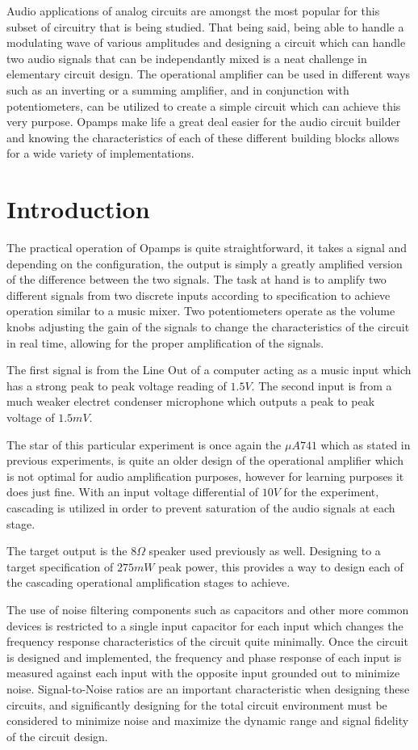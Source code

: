 \documentclass[12pt]{article}
\begin{document}
Audio applications of analog circuits are amongst the most
popular for this subset of circuitry that is being studied. That being said,
being able to handle a modulating wave of various amplitudes and designing a
circuit which can handle two audio signals that can be independantly mixed is a
neat challenge in elementary circuit design. The operational amplifier can be
used in different ways such as an inverting or a summing amplifier, and in
conjunction with potentiometers, can be utilized to create a simple circuit
which can achieve this very purpose. Opamps make life a great deal easier for
the audio circuit builder and knowing the characteristics of each of these
different building blocks allows for a wide variety of implementations.
\newpage
\section{Introduction}
The practical operation of Opamps is quite straightforward, it takes a signal
and depending on the configuration, the output is simply a greatly amplified
version of the difference between the two signals. The task at hand is to
amplify two different signals from two discrete inputs according to
specification to achieve operation similar to a music mixer. Two potentiometers
operate as the volume knobs adjusting the gain of the signals to change the
characteristics of the circuit in real time, allowing for the proper
amplification of the signals.

The first signal is from the Line Out of a computer acting as a music input
which has a strong peak to peak voltage reading of $1.5V$. The second input is
from a much weaker electret condenser microphone which outputs a peak to peak
voltage of $1.5mV$.

The star of this particular experiment is once again the $\mu A741$ which as
stated in previous experiments, is quite an older design of the operational
amplifier which is not optimal for audio amplification purposes, however for
learning purposes it does just fine. With an input voltage differential of
$10V$ for the experiment, cascading is utilized in order to prevent saturation
of the audio signals at each stage.

The target output is the $8\Omega$ speaker used previously as well. Designing to
a target specification of $275mW$ peak power, this provides a way to design each
of the cascading operational amplification stages to achieve.

The use of noise filtering components such as capacitors and other more common
devices is restricted to a single input capacitor for each input which changes
the frequency response characteristics of the circuit quite minimally. Once the
circuit is designed and implemented, the frequency and phase response of each
input is measured against each input with the opposite input grounded out to
minimize noise. Signal-to-Noise ratios are an important characteristic when
designing these circuits, and significantly designing for the total circuit
environment must be considered to minimize noise and maximize the dynamic range
and signal fidelity of the circuit design.
\end{document}
